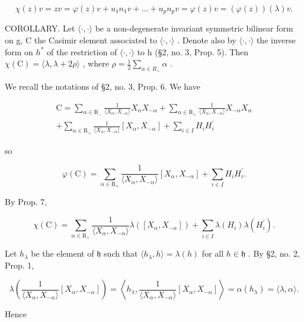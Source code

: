 \[
\chi (z) v = z v = \varphi (z) v + u _ {1} n _ {1} v + \dots + u _ {p} n _ {p} v = \varphi (z) v = (\varphi (z)) (\lambda) v.
\]

COROLLARY. Let \(\langle\cdot,\cdot\rangle\) be a non-degenerate invariant symmetric bilinear form on g, C the Casimir element associated to \(\langle\cdot,\cdot\rangle\) . Denote also by \(\langle\cdot,\cdot\rangle\) the inverse form on \(h^{*}\) of the restriction of \(\langle\cdot,\cdot\rangle\) to h (§2, no. 3, Prop. 5). Then \(\chi(\mathrm{C})=\langle\lambda,\lambda+2\rho\rangle\) , where \(\rho=\frac{1}{2}\sum_{\alpha\in R_{+}}\alpha\) .

We recall the notations of §2, no. 3, Prop. 6. We have

\[
\begin{array}{r} \mathrm{C} = \sum_ {\alpha \in \mathrm{R} _ {-}} \frac {1}{\langle X _ {\alpha} , X _ {- \alpha} \rangle} X _ {\alpha} X _ {- \alpha} + \sum_ {\alpha \in \mathrm{R} _ {+}} \frac {1}{\langle X _ {\alpha} , X _ {- \alpha} \rangle} X _ {- \alpha} X _ {\alpha} \\ + \sum_ {\alpha \in \mathrm{R} _ {+}} \frac {1}{\langle X _ {\alpha} , X _ {- \alpha} \rangle} [ X _ {\alpha}, X _ {- \alpha} ] + \sum_ {i \in I} H _ {i} H _ {i} ^ {\prime} \end{array}
\]

so

\[
\varphi (\mathrm{C}) = \sum_ {\alpha \in \mathrm{R} _ {+}} \frac {1}{\langle X _ {\alpha} , X _ {- \alpha} \rangle} [ X _ {\alpha}, X _ {- \alpha} ] + \sum_ {i \in I} H _ {i} H _ {i} ^ {\prime}.
\]

By Prop. 7,

\[
\chi (\mathrm{C}) = \sum_ {\alpha \in \mathrm{R} _ {+}} \frac {1}{\langle X _ {\alpha} , X _ {- \alpha} \rangle} \lambda ([ X _ {\alpha}, X _ {- \alpha} ]) + \sum_ {i \in I} \lambda (H _ {i}) \lambda (H _ {i} ^ {\prime}).
\]

Let \(h_{\lambda}\) be the element of \(\mathfrak{h}\) such that \(\langle h_{\lambda}, h \rangle = \lambda(h)\) for all \(h \in \mathfrak{h}\) . By §2, no. 2, Prop. 1,

\[
\lambda \left(\frac {1}{\langle X _ {\alpha} , X _ {- \alpha} \rangle} [ X _ {\alpha}, X _ {- \alpha} ]\right) = \left\langle h _ {\lambda}, \frac {1}{\langle X _ {\alpha} , X _ {- \alpha} \rangle} [ X _ {\alpha}, X _ {- \alpha} ] \right\rangle = \alpha (h _ {\lambda}) = \langle \lambda , \alpha \rangle .
\]

Hence

